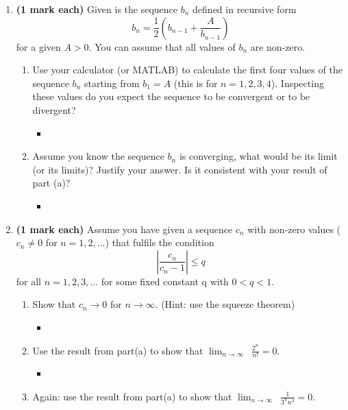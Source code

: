 \documentclass[12pt]{report}
\begin{document}
\begin{enumerate}[leftmargin=\labelsep]
\newpage

    \item {\bf (1 mark each)} Given is the sequence $b_n$ defined in recursive form
        \begin{equation*}
            b_n=\frac{1}{2}\left(b_{n-1}+\frac{A}{b_{n-1}} \right)
        \end{equation*} for a given $A>0$. You can assume that all values of $b_n$ are non-zero.
        \begin{enumerate}
            \item Use your calculator (or MATLAB) to calculate the first four values of the sequence $b_n$ starting from $b_1=A$ (this is for $n=1,2,3,4$). Inspecting these values do you expect the sequence to be convergent or to be divergent?
                \begin{itemize}[label={}]
                    \item 
                \end{itemize}
            \item Assume you know the sequence $b_n$ is converging, what would be its limit (or its limits)? Justify your answer. Is it consistent with your result of part (a)?
                \begin{itemize}[label={}]
                    \item 
                \end{itemize}
        \end{enumerate}

\newpage

    \item {\bf (1 mark each)} Assume you have given a sequence $c_n$ with non-zero values ($c_n\neq0$ for $n=1,2,\dots$) that fulfils the condition
        \begin{equation}
            \left|\frac{c_n}{c_n-1}\right|\leq q
        \end{equation} for all $n=1,2,3,\dots$ for some fixed constant q with $0<q<1$.
        \begin{enumerate}
            \item Show that $c_n\to0$ for $n\to \infty$. (Hint: use the squeeze theorem)
                \begin{itemize}[label={}]
                    \item 
                \end{itemize}
            \item Use the result from part(a) to show that $\displaystyle{\lim_{n \to \infty}}\,\,\, \frac{2^n}{n!}=0$.
                \begin{itemize}[label={}]
                    \item 
                \end{itemize}
            \item Again: use the result from part(a) to show that $\displaystyle{\lim_{n \to \infty}}\,\,\, \frac{1}{3^nn^3}=0$.
        \end{enumerate}


\end{enumerate}
\end{document}
